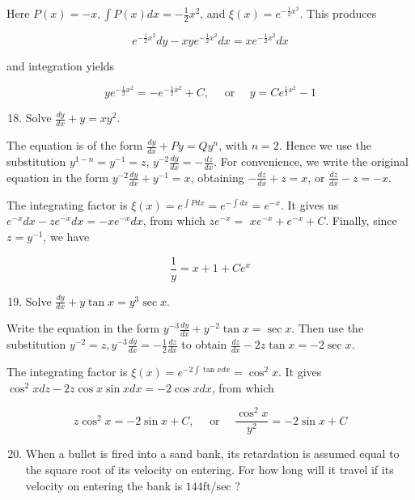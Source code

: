 \documentclass[10pt]{article}
\begin{document}
Here $P(x)=-x, \int P(x) d x=-\frac{1}{2} x^{2}$, and $\xi(x)=e^{-\frac{1}{2} x^{2}}$. This produces

$$
e^{-\frac{1}{2} x^{2}} d y-x y e^{-\frac{1}{2} x^{2}} d x=x e^{-\frac{1}{2} x^{2}} d x
$$

and integration yields

$$
y e^{-\frac{1}{2} x^{2}}=-e^{-\frac{1}{2} x^{2}}+C, \quad \text { or } \quad y=C e^{\frac{1}{2} x^{2}}-1
$$

\begin{enumerate}
  \setcounter{enumi}{17}
  \item Solve $\frac{d y}{d x}+y=x y^{2}$.
\end{enumerate}

The equation is of the form $\frac{d y}{d x}+P y=Q y^{n}$, with $n=2$. Hence we use the substitution $y^{1-n}=y^{-1}=z$, $y^{-2} \frac{d y}{d x}=-\frac{d z}{d x}$. For convenience, we write the original equation in the form $y^{-2} \frac{d y}{d x}+y^{-1}=x$, obtaining $-\frac{d z}{d x}+z=x$, or $\frac{d z}{d x}-z=-x$.

The integrating factor is $\xi(x)=e^{\int P d x}=e^{-\int d x}=e^{-x}$. It gives us $e^{-x} d x-z e^{-x} d x=-x e^{-x} d x$, from which $z e^{-x}=$ $x e^{-x}+e^{-x}+C$. Finally, since $z=y^{-1}$, we have

$$
\frac{1}{y}=x+1+C e^{x}
$$

\begin{enumerate}
  \setcounter{enumi}{18}
  \item Solve $\frac{d y}{d x}+y \tan x=y^{3} \sec x$.
\end{enumerate}

Write the equation in the form $y^{-3} \frac{d y}{d x}+y^{-2} \tan x=\sec x$. Then use the substitution $y^{-2}=z, y^{-3} \frac{d y}{d x}=-\frac{1}{2} \frac{d z}{d x}$ to obtain $\frac{d z}{d x}-2 z \tan x=-2 \sec x$.

The integrating factor is $\xi(x)=e^{-2 \int \tan x d x}=\cos ^{2} x$. It gives $\cos ^{2} x d z-2 z \cos x \sin x d x=-2 \cos x d x$, from which

$$
z \cos ^{2} x=-2 \sin x+C, \quad \text { or } \quad \frac{\cos ^{2} x}{y^{2}}=-2 \sin x+C
$$

\begin{enumerate}
  \setcounter{enumi}{19}
  \item When a bullet is fired into a sand bank, its retardation is assumed equal to the square root of its velocity on entering. For how long will it travel if its velocity on entering the bank is $144 \mathrm{ft} / \mathrm{sec}$ ?
\end{enumerate}
\end{document}
